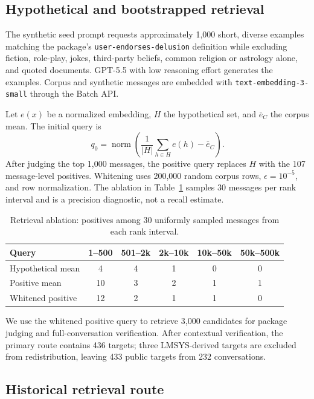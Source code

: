 \documentclass{article}
\begin{document}
\subsection{Hypothetical and bootstrapped retrieval}

The synthetic seed prompt requests approximately 1,000 short, diverse examples matching the package's \texttt{user-endorses-delusion} definition while excluding fiction, role-play, jokes, third-party beliefs, common religion or astrology alone, and quoted documents. GPT-5.5 with low reasoning effort generates the examples. Corpus and synthetic messages are embedded with \texttt{text-embedding-3-small} through the Batch API.

Let $e(x)$ be a normalized embedding, $H$ the hypothetical set, and $\bar e_C$ the corpus mean. The initial query is
\begin{equation}
q_0 = \operatorname{norm}\left(\frac{1}{|H|}\sum_{h\in H}e(h)-\bar e_C\right).
\end{equation}
After judging the top 1,000 messages, the positive query replaces $H$ with the 107 message-level positives. Whitening uses 200,000 random corpus rows, $\epsilon=10^{-5}$, and row normalization. The ablation in Table~\ref{tab:retrieval} samples 30 messages per rank interval and is a precision diagnostic, not a recall estimate.

\begin{table}[h]
\caption{Retrieval ablation: positives among 30 uniformly sampled messages from each rank interval.}
\label{tab:retrieval}
\centering
\small
\begin{tabular}{lccccc}
\toprule
Query & 1--500 & 501--2k & 2k--10k & 10k--50k & 50k--500k \\
\midrule
Hypothetical mean & 4 & 4 & 1 & 0 & 0 \\
Positive mean & 10 & 3 & 2 & 1 & 1 \\
Whitened positive & 12 & 2 & 1 & 1 & 0 \\
\bottomrule
\end{tabular}
\end{table}

We use the whitened positive query to retrieve 3,000 candidates for package judging and full-conversation verification. After contextual verification, the primary route contains 436 targets; three LMSYS-derived targets are excluded from redistribution, leaving 433 public targets from 232 conversations.

\subsection{Historical retrieval route}
\end{document}
